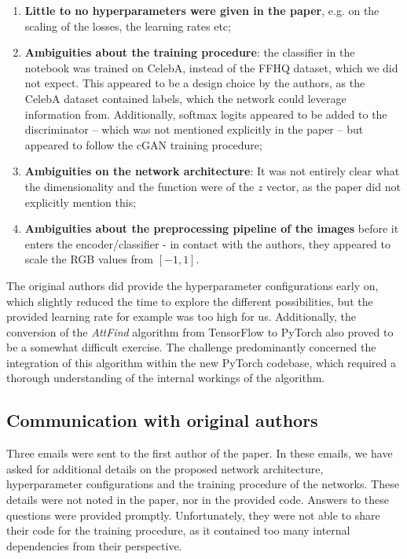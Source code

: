 \begin{enumerate}
    \item \textbf{Little to no hyperparameters were given in the paper}, e.g. on the scaling of the losses, the learning rates etc;
    \item \textbf{Ambiguities about the training procedure}: the classifier in the notebook was trained on CelebA, instead of the FFHQ dataset, which we did not expect. This appeared to be a design choice by the authors, as the CelebA dataset contained labels, which the network could leverage information from. Additionally, softmax logits appeared to be added to the discriminator -- which was not mentioned explicitly in the paper -- but appeared to follow the cGAN \cite{mirza2014conditional} training procedure;
    \item \textbf{Ambiguities on the network architecture}: It was not entirely clear what the dimensionality and the function were of the $z$ vector, as the paper did not explicitly mention this;
    \item \textbf{Ambiguities about the preprocessing pipeline of the images} before it enters the encoder/classifier - in contact with the authors, they appeared to scale the RGB values from $[-1,1]$.
\end{enumerate}

The original authors did provide the hyperparameter configurations early on, which slightly reduced the time to explore the different possibilities, but the provided learning rate for example was too high for us. Additionally, the conversion of the \textit{AttFind} algorithm from TensorFlow to PyTorch also proved to be a somewhat difficult exercise. The challenge predominantly concerned the integration of this algorithm within the new PyTorch codebase, which required a thorough understanding of the internal workings of the algorithm.


\subsection{Communication with original authors}
Three emails were sent to the first author of the paper. In these emails, we have asked for additional details on the proposed network architecture, hyperparameter configurations and the training procedure of the networks. These details were not noted in the paper, nor in the provided code. Answers to these questions were provided promptly. Unfortunately, they were not able to share their code for the training procedure, as it contained too many internal dependencies from their perspective.
